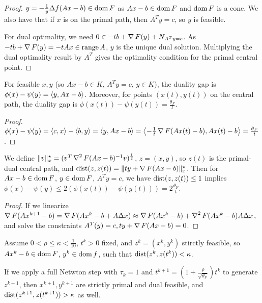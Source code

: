\begin{proof}
  $y = -\frac{1}{y} \Delta f(Ax - b) \in \operatorname*{dom} F$ as $Ax - b \in \operatorname*{dom}
  F$ and $\operatorname*{dom} F$ is a cone.  We also have that if $x$ is on the primal path,
  then $A^{T} y = c$, so $y$ is feasible.

  For dual optimality, we need $0 \in -tb + \operatorname*{\nabla} F(y) + N_{A^{T} y =
    c}$. As $-tb + \operatorname*{\nabla} F(y) = -tAx \in \operatorname*{range} A$, $y$ is the unique
  dual solution.  Multiplying the dual optimality result by $A^{T}$
  gives the optimality condition for the primal central point.
\end{proof}

\begin{thm}
  \label{sec:inter-point-meth-4}
  For feasible $x, y$ (so $Ax - b \in K$, $A^{T}y = c$, $y \in K$),
  the duality gap is $\phi(x) - \psi(y) = \IP{y, Ax - b}$.  Moreover,
  for points $(x(t), y(t))$ on the central path, the duality gap is
  $\phi(x(t)) - \psi(y(t)) = \frac{\theta_{F}}{t}$.
\end{thm}

\begin{proof}
  $\phi(x) - \psi(y) = \IP{c, x} - \IP{b, y} = \IP{y, Ax - b} =
  \IP{-\frac{1}{t} \grad F(Ax(t) - b), Ax(t) - b} = \frac{\theta_{F}}{t}$.
\end{proof}

\begin{thm}
  \label{sec:inter-point-meth-5}
  We define $\| v \|_{x}^{\star} = (v^{T} \operatorname*{\nabla}^{2} F(Ax - b)^{-1}
  v)^{\frac{1}{2}}$, $z = (x, y)$, so $z(t)$ is the primal-dual
  central path, and $\operatorname*{dist}(z, z(t)) = \| ty + \operatorname*{\nabla} F(Ax -
  b)\|_{x}^{\star}$.
  Then for $Ax - b \in \operatorname*{dom} F$, $y \in \operatorname*{dom} F$, $A^{T}y = c$, we have
  $\operatorname*{dist}(z, z(t)) \leq 1$ implies $\phi(x) - \psi(y) \leq 2(\phi(x(t))
  - \psi(y(t))) = 2 \frac{\theta_{F}}{t}$.
\end{thm}

\begin{proof}
  If we linearize $\operatorname*{\nabla} F(Ax^{k+1} - b) = \operatorname*{\nabla} F(Ax^{k} - b + A
  \Delta x) \approx \operatorname*{\nabla} F(A x^{k} - b) + \operatorname*{\nabla}^{2} F(Ax^{k} - b) A
  \Delta x$, and solve the constraints $A^{T}(y) = c, ty + \operatorname*{\nabla} F(Ax
  - b) = 0$.
\end{proof}

\begin{thm}
  \label{sec:inter-point-meth-6}
  Assume $0 < \rho \leq \kappa < \frac{1}{10}$, $t^{k} > 0$ fixed, and
  $z^{k} = (x^{k}, y^{k})$ stirctly feasible, so $Ax^{k} - b \in \operatorname*{dom}
  F$, $y^{k} \in \operatorname*{dom} f$, such that $\operatorname*{dist}(z^{k}, z(t^{k})) < \kappa$.

  If we apply a full Netwton step with $\tau_{k} = 1$ and $t^{k+1} = (1
  + \frac{\rho}{\sqrt{\theta_{F}}}) t^{k}$ to generate $z^{k+1}$, then
  $x^{k+1}, y^{k+1}$ are strictly primal and dual feasible, and
  $\operatorname*{dist}(z^{k+1}, z(t^{k+1})) > \kappa$ as well.
\end{thm}

